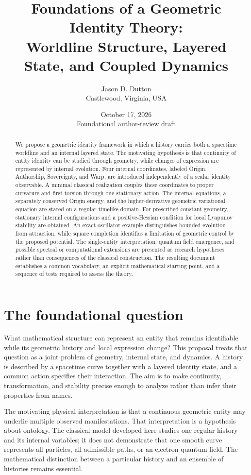 \documentclass[11pt]{article}
\title{Foundations of a Geometric Identity Theory:\\Worldline Structure, Layered State, and Coupled Dynamics}
\author{Jason D. Dutton\\Castlewood, Virginia, USA}
\date{October 17, 2026\\\small Foundational author-review draft}
\begin{document}
\maketitle
\begin{abstract}
We propose a geometric identity framework in which a history carries both a spacetime worldline and an internal layered state. The motivating hypothesis is that continuity of entity identity can be studied through geometry, while changes of expression are represented by internal evolution. Four internal coordinates, labeled Origin, Authorship, Sovereignty, and Warp, are introduced independently of a scalar identity observable. A minimal classical realization couples these coordinates to proper curvature and first torsion through one stationary action. The internal equations, a separately conserved Origin energy, and the higher-derivative geometric variational equation are stated on a regular timelike domain. For prescribed constant geometry, stationary internal configurations and a positive-Hessian condition for local Lyapunov stability are obtained. An exact oscillator example distinguishes bounded evolution from attraction, while square completion identifies a limitation of geometric control by the proposed potential. The single-entity interpretation, quantum field emergence, and possible spectral or computational extensions are presented as research hypotheses rather than consequences of the classical construction. The resulting document establishes a common vocabulary, an explicit mathematical starting point, and a sequence of tests required to assess the theory.
\end{abstract}

\section{The foundational question}
What mathematical structure can represent an entity that remains identifiable while its geometric history and local expression change? This proposal treats that question as a joint problem of geometry, internal state, and dynamics. A history is described by a spacetime curve together with a layered identity state, and a common action specifies their interaction. The aim is to make continuity, transformation, and stability precise enough to analyze rather than infer their properties from names.

The motivating physical interpretation is that a continuous geometric entity may underlie multiple observed manifestations. That interpretation is a hypothesis about ontology. The classical model developed here studies one regular history and its internal variables; it does not demonstrate that one smooth curve represents all particles, all admissible paths, or an electron quantum field. The mathematical distinction between a particular history and an ensemble of histories remains essential.
\end{document}
